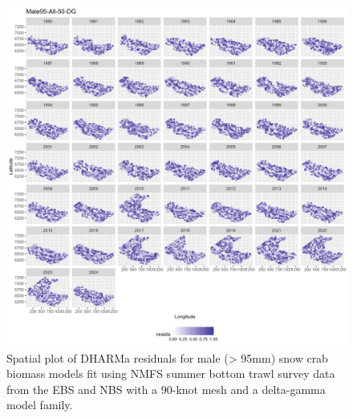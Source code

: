 \documentclass[
]{article}
\begin{document}
\begin{figure}

{\centering \includegraphics[width=1\linewidth,height=1\textheight]{../SNOW/Figures/DHARMa_Male95-All-50-DG_SPATIAL} 

}

\caption{Spatial plot of DHARMa residuals for male (> 95mm) snow crab biomass models fit using NMFS summer bottom trawl survey data from the EBS and NBS with a 90-knot mesh and a delta-gamma model family.}\label{fig:snow-DHARMa-spat-90-male95-EBSNBS}
\end{figure}
\end{document}

